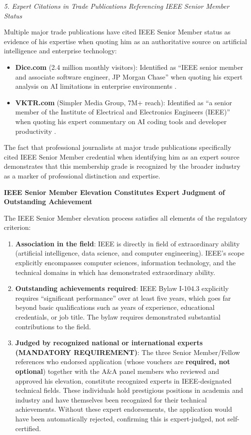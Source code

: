 \textit{5. Expert Citations in Trade Publications Referencing IEEE Senior Member Status}

Multiple major trade publications have cited \drs IEEE Senior Member status as evidence of his expertise when quoting him as an authoritative source on artificial intelligence and enterprise technology:

\begin{itemize}
    \item \textbf{Dice.com} (2.4 million monthly visitors): Identified \dr as ``IEEE senior member and associate software engineer, JP Morgan Chase'' when quoting his expert analysis on AI limitations in enterprise environments \cite{PM11}.
    \item \textbf{VKTR.com} (Simpler Media Group, 7M+ reach): Identified \dr as ``a senior member of the Institute of Electrical and Electronics Engineers (IEEE)'' when quoting his expert commentary on AI coding tools and developer productivity \cite{PM12}.
\end{itemize}

The fact that professional journalists at major trade publications specifically cited \drs IEEE Senior Member credential when identifying him as an expert source demonstrates that this membership grade is recognized by the broader industry as a marker of professional distinction and expertise.

\textbf{IEEE Senior Member Elevation Constitutes Expert Judgment of Outstanding Achievement}

The IEEE Senior Member elevation process satisfies all elements of the regulatory criterion:

\begin{enumerate}
    \item \textbf{Association in the field}: IEEE is directly in \drs field of extraordinary ability (artificial intelligence, data science, and computer engineering). IEEE's scope explicitly encompasses computer sciences, information technology, and the technical domains in which \dr has demonstrated extraordinary ability.
    
    \item \textbf{Outstanding achievements required}: IEEE Bylaw I-104.3 explicitly requires ``significant performance'' over at least five years, which goes far beyond basic qualifications such as years of experience, educational credentials, or job title. The bylaw requires demonstrated substantial contributions to the field.
    
    \item \textbf{Judged by recognized national or international experts (MANDATORY REQUIREMENT)}: The three Senior Member/Fellow references who endorsed \drs application (whose vouchers are \textbf{required, not optional}) together with the A\&A panel members who reviewed and approved his elevation, constitute recognized experts in IEEE-designated technical fields. These individuals hold prestigious positions in academia and industry and have themselves been recognized for their technical achievements. Without these expert endorsements, the application would have been automatically rejected, confirming this is expert-judged, not self-certified.
\end{enumerate}


